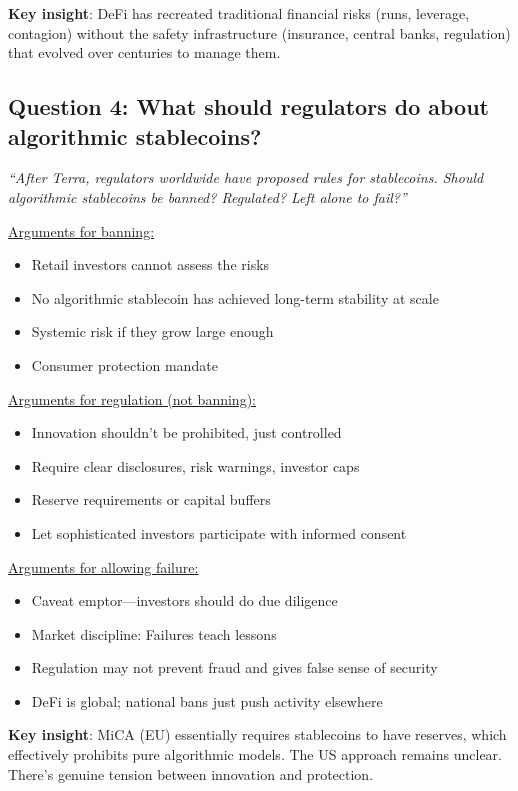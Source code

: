 \documentclass[11pt]{article}
\begin{document}
\medskip
\noindent\textbf{Key insight}: DeFi has recreated traditional financial risks (runs, leverage, contagion) without the safety infrastructure (insurance, central banks, regulation) that evolved over centuries to manage them.

\subsection*{Question 4: What should regulators do about algorithmic stablecoins?}

\textit{``After Terra, regulators worldwide have proposed rules for stablecoins. Should algorithmic stablecoins be banned? Regulated? Left alone to fail?''}

\medskip
\noindent\underline{Arguments for banning:}
\begin{itemize}[leftmargin=*]
\item Retail investors cannot assess the risks
\item No algorithmic stablecoin has achieved long-term stability at scale
\item Systemic risk if they grow large enough
\item Consumer protection mandate
\end{itemize}

\medskip
\noindent\underline{Arguments for regulation (not banning):}
\begin{itemize}[leftmargin=*]
\item Innovation shouldn't be prohibited, just controlled
\item Require clear disclosures, risk warnings, investor caps
\item Reserve requirements or capital buffers
\item Let sophisticated investors participate with informed consent
\end{itemize}

\medskip
\noindent\underline{Arguments for allowing failure:}
\begin{itemize}[leftmargin=*]
\item Caveat emptor---investors should do due diligence
\item Market discipline: Failures teach lessons
\item Regulation may not prevent fraud and gives false sense of security
\item DeFi is global; national bans just push activity elsewhere
\end{itemize}

\medskip
\noindent\textbf{Key insight}: MiCA (EU) essentially requires stablecoins to have reserves, which effectively prohibits pure algorithmic models. The US approach remains unclear. There's genuine tension between innovation and protection.
\end{document}
